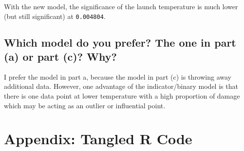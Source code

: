 \documentclass[11pt]{article}
\begin{document}
With the new model, the significance of the launch temperature is much
lower (but still significant) at \texttt{0.004804}.
\subsection{Which model do you prefer? The one in part (a) or part (c)? Why?}
\label{sec-2-4}


I prefer the model in part a, because the model in part (c) is
throwing away additional data. However, one advantage of the
indicator/binary model is that there is one data point at lower
temperature with a high proportion of damage which may be acting as
an outlier or influential point.
\section{Appendix: Tangled R Code}
\label{sec-3}


 
\end{document}
